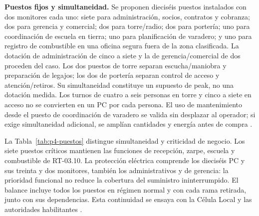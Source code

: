 ﻿\textbf{Puestos fijos y simultaneidad.} Se proponen dieciséis puestos instalados con dos monitores cada uno: siete para administración, socios, contratos y cobranza; dos para gerencia y comercial; dos para torre/radio; dos para portería; uno para coordinación de escuela en tierra; uno para planificación de varadero; y uno para registro de combustible en una oficina segura fuera de la zona clasificada. La dotación de administración de cinco a siete y la de gerencia/comercial de dos proceden del caso. Los dos puestos de torre separan escucha/maniobra y preparación de legajos; los dos de portería separan control de acceso y atención/retiros. Su simultaneidad constituye un supuesto de peak, no una dotación medida. Los turnos de cuatro a seis personas en torre y cinco a siete en acceso no se convierten en un PC por cada persona. El uso de mantenimiento desde el puesto de coordinación de varadero se valida sin desplazar al operador; si exige simultaneidad adicional, se amplían cantidades y energía antes de compra \parencite[cap.~2, secc.~2.4; cap.~14, secc.~14.2]{caso07}.

La Tabla~\ref{tab:p4-puestos} distingue simultaneidad y criticidad de negocio. Los siete puestos críticos mantienen las funciones de recepción, zarpe, escuela y combustible de RT-03.10. La protección eléctrica comprende los dieciséis PC y sus treinta y dos monitores, también los administrativos y de gerencia: la prioridad funcional no reduce la cobertura del suministro ininterrumpido. El balance incluye todos los puestos en régimen normal y con cada rama retirada, junto con sus dependencias. Esta continuidad se ensaya con la Célula Local y las autoridades habilitantes \parencite[RT-06.07, p.~15; RT-08.04, p.~18]{pucv-transversal}.

